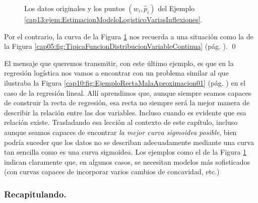 \begin{ejemplo}
\begin{figure}[h!]
\begin{center}
\begin{bn}
\end{bn}
\caption{Los datos originales y los puntos $(w_i, \hat p_i)$ del Ejemplo \ref{cap13:ejem:EstimacionModeloLogisticoVariasInflexiones}. }
\label{cap13:fig:ModeloLogisticoVariasInflexiones}
\end{center}
\end{figure}

Por el contrario, la curva de la Figura \ref{cap13:fig:ModeloLogisticoVariasInflexiones} nos recuerda a una situación como la de la Figura \ref{cap05:fig:TipicaFuncionDistribucionVariableContinua} (pág. \pageref{cap05:fig:TipicaFuncionDistribucionVariableContinua}).
\qed
\end{ejemplo}

\noindent El mensaje que queremos transmitir, con este último ejemplo, es que en la regresión logística nos vamos a encontrar con un problema similar al que ilustraba la Figura \ref{cap10:fig:EjemploRectaMalaAproximacion01} (pág. \pageref{cap10:fig:EjemploRectaMalaAproximacion01}) en el caso de la regresión lineal. Allí aprendimos que, aunque siempre seamos capaces de construir la recta de regresión, esa recta no siempre será la mejor manera de describir la relación entre las dos variables. Incluso cuando es evidente que esa relación existe. Trasladando esa lección al contexto de este capítulo, incluso aunque seamos capaces de encontrar {\em la mejor curva sigmoidea posible}, bien podría suceder que los datos no se describan adecuadamente mediante una curva tan sencilla como es una curva sigmoidea. Los ejemplos como el de la Figura \ref{cap13:fig:ModeloLogisticoVariasInflexiones} indican claramente que, en algunos casos, se necesitan modelos más sofisticados (con curvas capaces de incorporar varios cambios de concavidad, etc.)\\

\subsubsection*{Recapitulando.}

